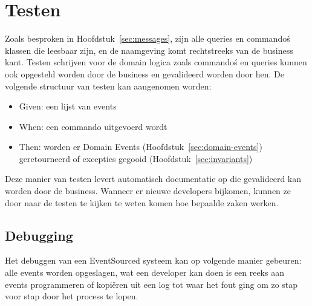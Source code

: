 
\section{Testen}
\label{sec:testen}

Zoals besproken in Hoofdstuk~\ref{sec:messages}, zijn alle queries en commando\'s klassen die leesbaar zijn, en de naamgeving komt rechtstreeks van de business kant. Testen schrijven voor de domain logica zoals commando\'s en queries kunnen ook opgesteld worden door de business en gevalideerd worden door hen.
De volgende structuur van testen kan aangenomen worden:

\begin{itemize}
  \item{Given: een lijst van events}
  \item{When: een commando uitgevoerd wordt}
  \item{Then: worden er Domain Events (Hoofdstuk~\ref{sec:domain-events}) geretourneerd of excepties gegooid (Hoofdstuk~\ref{sec:invariants})}
\end{itemize}

Deze manier van testen levert automatisch documentatie op die gevalideerd kan worden door de business.
Wanneer er nieuwe developers bijkomen, kunnen ze door naar de testen te kijken te weten komen hoe bepaalde zaken werken.

\subsection{Debugging}
\label{subsec:debugging}

Het debuggen van een EventSourced systeem kan op volgende manier gebeuren: alle events worden opgeslagen, wat een developer kan doen is een reeks aan events programmeren of kopiëren uit een log tot waar het fout ging om zo stap voor stap door het process te lopen.
